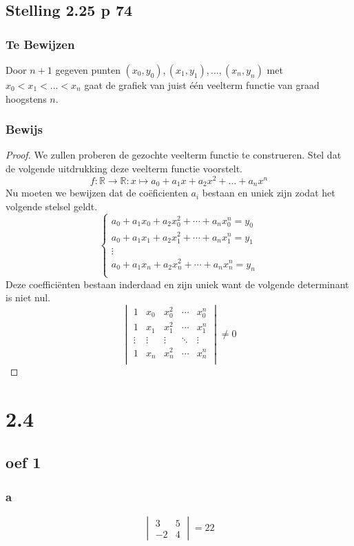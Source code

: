 \documentclass[lineaire_algebra_oplossingen.tex]{subfiles}
\begin{document}
\subsection{Stelling 2.25 p 74}
\subsubsection*{Te Bewijzen}
Door $n+1$ gegeven punten $(x_0,y_0),(x_1,y_1),...,(x_n,y_n)$ met $x_0 < x_1 < ... < x_n$ gaat de grafiek van juist \'e\'en veelterm functie van graad hoogstens $n$.
\subsubsection*{Bewijs}
\begin{proof}
We zullen proberen de gezochte veelterm functie te construeren.
Stel dat de volgende uitdrukking deze veelterm functie voorstelt.
\[
f: \mathbb{R} \rightarrow \mathbb{R} : x \mapsto a_0 + a_1x + a_2x^2+...+a_nx^n
\]
Nu moeten we bewijzen dat de co\"eficienten $a_i$ bestaan en uniek zijn zodat het volgende stelsel geldt.
\[
\left\lbrace
\begin{array}{ c }
a_0 + a_1x_0 + a_2x_0^2 + \cdots + a_nx_0^n = y_0\\
a_0 + a_1x_1 + a_2x_1^2 + \cdots + a_nx_1^n = y_1\\
\vdots\\
a_0 + a_1x_n + a_2x_n^2 + \cdots + a_nx_n^n = y_n\\
\end{array}
\right.
\]
Deze coeffici\"enten bestaan inderdaad en zijn uniek want de volgende determinant is niet nul.
\[
\begin{vmatrix}
1 & x_0 & x_0^2 & \cdots & x_0^n\\
1 & x_1 & x_1^2 & \cdots & x_1^n\\
\vdots & \vdots & \vdots & \ddots & \vdots \\
1 & x_n & x_n^2 & \cdots & x_n^n\\
\end{vmatrix}
\neq 0
\]
\end{proof}


\section{2.4}
\subsection{oef 1}
\subsubsection*{a}
\[
\begin{vmatrix}
3 & 5\\
-2 & 4
\end{vmatrix}
= 22
\]
\end{document}

